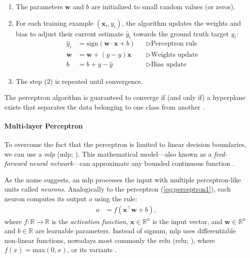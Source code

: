 \begin{enumerate}
    \item The parameters $\textbf{w}$ and $b$ are initialized to small random values (or zeros).
    \item For each training example $(\mathbf{x}_i, y_i)$, the algorithm updates the weights and bias to adjust their current estimate $\hat{y}_i$ towards the ground truth target $y_i$:
          \begin{align} \label{eq:perceptron1}
              \hat{y}_i  & = \text{sign}(\textbf{w} \cdot \mathbf{x} + b) &  & \triangleright\text{Perceptron rule} \\
              \textbf{w} & = \textbf{w} + (y - \hat{y}) \textbf{x}        &  & \triangleright\text{Weights update}  \\
              b          & = b + y - \hat{y}                              &  & \triangleright\text{Bias update}
          \end{align}
    \item The step (2) is repeated until convergence.
\end{enumerate}

The perceptron algorithm is guaranteed to converge if (and only if) a hyperplane exists that separates the data belonging to one class from another \cite{novikoff1962convergence}.

\paragraph{Multi-layer Perceptron} To overcome the fact that the perceptron is limited to linear decision boundaries, we can use a \emph{\acl{mlp}} (\acs{mlp}; \citealp[p.~164]{goodfellow2016deep}). This mathematical model---also known as a \emph{feed-forward neural network}---can approximate any bounded continuous function \cite{hornik1989multilayer}.

As the name suggests, an \ac{mlp} processes the input with multiple perceptron-like units called \textit{neurons}. Analogically to the perceptron (\autoref{eq:perceptron1}), each neuron computes its output $o$ using the rule:
\begin{align}
    o & = f(\mathbf{x}^\top \mathbf{w}  + b),
\end{align}
where $f: \mathbb{R} \rightarrow \mathbb{R}$ is the \emph{activation function}, $\mathbf{x}\in \mathbb{R}^n$ is the input vector, and $\mathbf{w} \in \mathbb{R}^n$ and $b \in \mathbb{R}$ are learnable parameters. Instead of signum, \ac{mlp} uses differentiable non-linear functions, nowadays most commonly the \acl{relu} (\acs{relu}; \citealp{nair2010rectified}), where $f(x) = \text{max}(0, x)$, or its variants \cite{hendrycks2016gaussian,dubey2022activation}.

